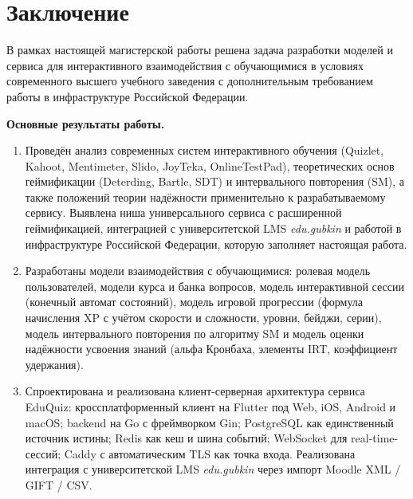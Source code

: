 \section*{Заключение}
\thispagestyle{plain}

В рамках настоящей магистерской работы решена задача разработки
моделей и сервиса для интерактивного взаимодействия с обучающимися
в условиях современного высшего учебного заведения с дополнительным
требованием работы в инфраструктуре Российской Федерации.

\textbf{Основные результаты работы.}

\begin{enumerate}[label=\arabic*., noitemsep]
    \item Проведён анализ современных систем интерактивного обучения
          (Quizlet, Kahoot, Mentimeter, Slido, JoyTeka, OnlineTestPad),
          теоретических основ геймификации (Deterding, Bartle, SDT)
          и интервального повторения (SM), а также положений
          теории надёжности применительно к разрабатываемому сервису.
          Выявлена ниша универсального сервиса с расширенной
          геймификацией, интеграцией с университетской LMS
          \textit{edu.gubkin} и работой в инфраструктуре Российской
          Федерации, которую заполняет настоящая работа.

    \item Разработаны модели взаимодействия с обучающимися:
          ролевая модель пользователей, модели курса и банка
          вопросов, модель интерактивной сессии (конечный автомат
          состояний), модель игровой прогрессии (формула начисления
          XP с учётом скорости и сложности, уровни, бейджи, серии),
          модель интервального повторения по алгоритму SM
          и модель оценки надёжности усвоения знаний (альфа Кронбаха,
          элементы IRT, коэффициент удержания).

    \item Спроектирована и реализована клиент-серверная архитектура
          сервиса EduQuiz: кроссплатформенный клиент на Flutter
          под Web, iOS, Android и macOS; backend на Go с фреймворком
          Gin; PostgreSQL как единственный источник истины; Redis
          как кеш и шина событий; WebSocket для real-time-сессий;
          Caddy с автоматическим TLS как точка входа. Реализована
          интеграция с университетской LMS \textit{edu.gubkin}
          через импорт Moodle XML / GIFT / CSV.


\end{enumerate}
